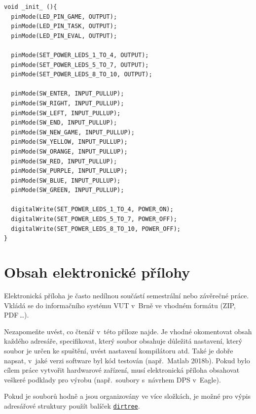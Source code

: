 \noindent
\begin{minipage}{\linewidth}

\begin{lstlisting}[frame=single,numbers=right,caption={Funkce init v~jazyce C++.},label=lst:priklad.vypis.kodu.C,basicstyle=\ttfamily\small, keywordstyle=\color{black}\bfseries\underbar,]
void _init_ (){
  pinMode(LED_PIN_GAME, OUTPUT);
  pinMode(LED_PIN_TASK, OUTPUT);
  pinMode(LED_PIN_EVAL, OUTPUT);

  pinMode(SET_POWER_LEDS_1_TO_4, OUTPUT);
  pinMode(SET_POWER_LEDS_5_TO_7, OUTPUT);
  pinMode(SET_POWER_LEDS_8_TO_10, OUTPUT);

  pinMode(SW_ENTER, INPUT_PULLUP);
  pinMode(SW_RIGHT, INPUT_PULLUP);
  pinMode(SW_LEFT, INPUT_PULLUP);
  pinMode(SW_END, INPUT_PULLUP);
  pinMode(SW_NEW_GAME, INPUT_PULLUP);
  pinMode(SW_YELLOW, INPUT_PULLUP);
  pinMode(SW_ORANGE, INPUT_PULLUP);
  pinMode(SW_RED, INPUT_PULLUP);
  pinMode(SW_PURPLE, INPUT_PULLUP);
  pinMode(SW_BLUE, INPUT_PULLUP);
  pinMode(SW_GREEN, INPUT_PULLUP);

  digitalWrite(SET_POWER_LEDS_1_TO_4, POWER_ON); 
  digitalWrite(SET_POWER_LEDS_5_TO_7, POWER_OFF);
  digitalWrite(SET_POWER_LEDS_8_TO_10, POWER_OFF);
}
\end{lstlisting}
\end{minipage}







\chapter{Obsah elektronické přílohy}
Elektronická příloha je často nedílnou součástí semestrální nebo závěrečné práce.
Vkládá se do informačního systému VUT v~Brně ve vhodném formátu (ZIP, PDF\,\dots).

Nezapomeňte uvést, co čtenář v~této příloze najde.
Je vhodné okomentovat obsah každého adresáře, specifikovat, který soubor obsahuje důležitá nastavení, který soubor je určen ke spuštění, uvést nastavení kompilátoru atd.
Také je dobře napsat, v~jaké verzi software byl kód testován (např.\ Matlab 2018b).
Pokud bylo cílem práce vytvořit hardwarové zařízení,
musí elektronická příloha obsahovat veškeré podklady pro výrobu (např.\ soubory s~návrhem DPS v~Eagle).

Pokud je souborů hodně a jsou organizovány ve více složkách, je možné pro výpis adresářové struktury použít balíček \href{https://www.ctan.org/pkg/dirtree}{\texttt{dirtree}}.

